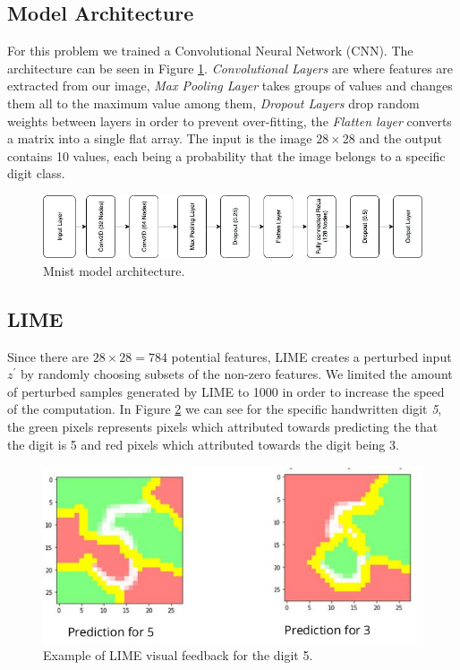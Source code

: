 \subsection{Model Architecture} \label{sect:mnist-architecture}
For this problem we trained a Convolutional Neural Network (CNN). The architecture can be seen in Figure \ref{fig:mnist-architecture}. \emph{Convolutional Layers} are where features are extracted from our image, \emph{Max Pooling Layer} takes groups of values and changes them all to the maximum value among them, \emph{Dropout Layers} drop random weights between layers in order to prevent over-fitting, the \emph{Flatten layer} converts a matrix into a single flat array. The input is the image $28\times28$ and the output contains 10 values, each being a probability that the image belongs to a specific digit class.
\begin  {figure}[!htpb]
  \includegraphics[width=\linewidth]{Evaluation_Images/mnist_architecture.png}
   \caption{Mnist model architecture.}
    \label{fig:mnist-architecture}
\end{figure}
\subsection{LIME}
Since there are $28 \times 28 = 784$ potential features, LIME creates a perturbed input $z^{'}$ by randomly choosing subsets of the non-zero features.  We limited the amount of perturbed samples generated by LIME to 1000 in order to increase the speed of the computation. In Figure \ref{fig:lime-mnist} we can see for the specific handwritten digit \emph{5}, the green pixels represents pixels which attributed towards predicting the that the digit is 5 and red pixels which attributed towards the digit being 3.
\begin  {figure}[!htpb]
  \includegraphics[width=\linewidth]{Evaluation_Images/Lime_mnist.jpg}
  \caption{Example of LIME visual feedback for the digit 5.}
  \label{fig:lime-mnist}
\end{figure}

